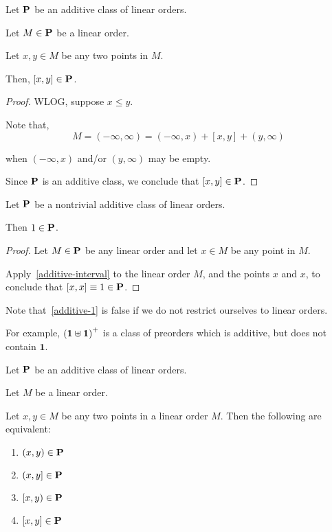 \begin{lemma}\label{additive-interval}
  Let $\mathbf{P}$ be an additive class of linear orders.

  Let $M \in \mathbf{P}$ be a linear order.

  Let $x, y \in M$ be any two points in $M$.

  Then, $[x, y] \in \mathbf{P}$.
\end{lemma}

\begin{proof}
  WLOG, suppose $x \le y$.

  Note that,
  \[
    M = (-\infty, \infty) = (-\infty, x) + [x, y] + (y, \infty)
  \]

  when $(-\infty, x)$ and/or $(y, \infty)$ may be empty.

  Since $\mathbf{P}$ is an additive class, we conclude that $[x, y] \in \mathbf{P}$.
\end{proof}

\begin{corollary}\label{additive-1}
  Let $\mathbf{P}$ be a nontrivial additive class of linear orders.

  Then $1 \in \mathbf{P}$.
\end{corollary}

\begin{proof}
  Let $M \in \mathbf{P}$ be any linear order and let
  $x \in M$ be any point in $M$.

  Apply~\cref{additive-interval} to the linear order $M$,
  and the points $x$ and $x$, to conclude that
  $[x, x] \equiv 1 \in \mathbf{P}$.
\end{proof}

\begin{note}
  Note that~\cref{additive-1} is false if we do not restrict ourselves to linear orders.

  For example, $\left( {\mathbf{1} \uplus \mathbf{1}} \right)^+$ is a class of preorders
  which is additive, but does not contain $\mathbf{1}$.
\end{note}

\begin{corollary}\label{additive-endpoints}
  Let $\mathbf{P}$ be an additive class of linear orders.

  Let $M$ be a linear order.

  Let $x, y \in M$ be any two points in a linear order $M$.
  Then the following are equivalent:

  \begin{enumerate}
    \item $(x, y) \in \mathbf{P}$
    \item $(x, y] \in \mathbf{P}$
    \item $[x, y) \in \mathbf{P}$
    \item $[x, y] \in \mathbf{P}$
  \end{enumerate}
\end{corollary}

